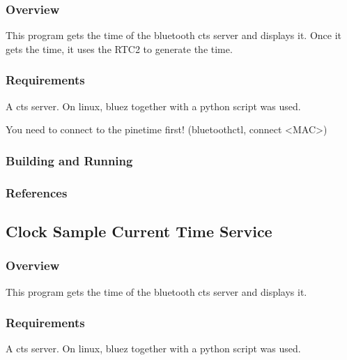 \documentclass[letterpaper,10pt,english]{sphinxmanual}
\begin{document}
\subsubsection{Overview}
\label{\detokenize{samples/gui/clock-cts-rtc2/README:overview}}
This program gets the time of the bluetooth cts server and displays it.
Once it gets the time, it uses the RTC2 to generate the time.


\subsubsection{Requirements}
\label{\detokenize{samples/gui/clock-cts-rtc2/README:requirements}}
A cts server.
On linux, bluez together with a python script was used.

You need to connect to the pinetime first!
(bluetoothctl, connect \textless{}MAC\textgreater{})


\subsubsection{Building and Running}
\label{\detokenize{samples/gui/clock-cts-rtc2/README:building-and-running}}

\subsubsection{References}
\label{\detokenize{samples/gui/clock-cts-rtc2/README:references}}

\subsection{Clock Sample Current Time Service}
\label{\detokenize{samples/gui/clock-cts/README:clock-sample-current-time-service}}\label{\detokenize{samples/gui/clock-cts/README:clock-sample-cts}}\label{\detokenize{samples/gui/clock-cts/README::doc}}

\subsubsection{Overview}
\label{\detokenize{samples/gui/clock-cts/README:overview}}
This program gets the time of the bluetooth cts server and displays it.


\subsubsection{Requirements}
\label{\detokenize{samples/gui/clock-cts/README:requirements}}
A cts server.
On linux, bluez together with a python script was used.
\end{document}
